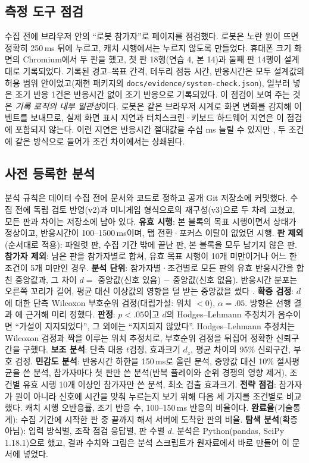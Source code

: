 \subsection{측정 도구 점검}
수집 전에 브라우저 안의 ``로봇 참가자''로 페이지를 점검했다.
로봇은 노란 원이 뜨면 정확히 250\,ms 뒤에 누르고, 캐치 시행에서는 누르지 않도록 만들었다.
휴대폰 크기 화면의 Chromium에서 두 판을 했고, 첫 판 18행(연습 4, 본 14)과 둘째 판 14행이 설계대로 기록되었다.
기록된 경고--목표 간격, 테두리 점등 시간, 반응시간은 모두 설계값의 허용 범위 안이었고(재현 패키지의 \texttt{docs/evidence/system-check.json}), 일부러 넣은 조기 반응 1건은 반응시간 없이 조기 반응으로 기록되었다.
이 점검이 보여 주는 것은 \emph{기록 로직의 내부 일관성}이다.
로봇은 같은 브라우저 시계로 화면 변화를 감지해 이벤트를 보내므로, 실제 화면 표시 지연과 터치스크린·키보드 하드웨어 지연은 이 점검에 포함되지 않는다.
이런 지연은 반응시간 절대값을 수십 ms 늘릴 수 있지만 \citep{pronk2020}, 두 조건에 같은 방식으로 들어가 조건 차이에서는 상쇄된다.

\subsection{사전 등록한 분석}
분석 규칙은 데이터 수집 전에 문서와 코드로 정하고 공개 Git 저장소에 커밋했다.
수집 전에 독립 검토 반영(v2)과 미니게임 형식으로의 재구성(v3)으로 두 차례 고쳤고, 모든 판과 차이는 저장소에 남아 있다.
\textbf{유효 시행}: 본 블록의 목표 시행이면서 상태가 정상이고, 반응시간이 100--1500\,ms이며, 탭 전환·포커스 이탈이 없었던 시행.
\textbf{판 제외}(순서대로 적용): 파일럿 판, 수집 기간 밖에 끝난 판, 본 블록을 모두 남기지 않은 판.
\textbf{참가자 제외}: 남은 판을 참가자별로 합쳐, 유효 목표 시행이 10개 미만이거나 어느 한 조건이 5개 미만인 경우.
\textbf{분석 단위}: 참가자별·조건별로 모든 판의 유효 반응시간을 합친 중앙값과, 그 차이 $d = $ 중앙값(신호 있음) $-$ 중앙값(신호 없음).
반응시간 분포는 오른쪽 꼬리가 길어, 평균 대신 이상값의 영향을 덜 받는 중앙값을 썼다 \citep{ratcliff1993}.
\textbf{확증 검정}: $d$에 대한 단측 Wilcoxon 부호순위 검정(대립가설: 위치 $<0$), $\alpha = .05$.
방향은 선행 결과 \citep{weinbach2012}에 근거해 미리 정했다.
\textbf{판정}: $p<.05$이고 $d$의 Hodges--Lehmann 추정치가 음수이면 ``가설이 지지되었다'', 그 외에는 ``지지되지 않았다''.
Hodges--Lehmann 추정치는 Wilcoxon 검정과 짝을 이루는 위치 추정치로, 부호순위 검정을 뒤집어 정확한 신뢰구간을 구했다.
\textbf{보조 분석}: 단측 대응 $t$검정, 효과크기 $d_z$, 평균 차이의 95\% 신뢰구간, 부호 검정.
\textbf{민감도 분석}: 반응시간 하한을 150\,ms로 올린 분석, 중앙값 대신 10\% 절사평균을 쓴 분석, 참가자마다 첫 판만 쓴 분석(반복 플레이와 순위 경쟁의 영향 제거), 조건별 유효 시행 10개 이상인 참가자만 쓴 분석, 최소 검출 효과크기.
\textbf{전략 점검}: 참가자가 원이 아니라 신호에 시간을 맞춰 누르는지 보기 위해 다음 세 가지를 조건별로 비교했다.
캐치 시행 오반응률, 조기 반응 수, 100--150\,ms 반응의 비율이다.
\textbf{완료율}(기술통계): 수집 기간에 시작한 판 중 끝까지 해서 서버에 도착한 판의 비율.
\textbf{탐색 분석}(확증 아님): 입력 방식별, 조작 점검 응답별, 판 수별 $d$.
분석은 Python(pandas, SciPy 1.18.1)으로 했고, 결과 수치와 그림은 분석 스크립트가 원자료에서 바로 만들어 이 문서에 넣었다.
